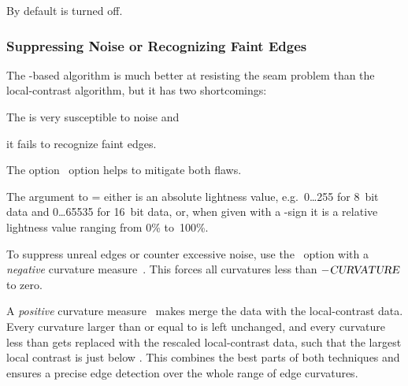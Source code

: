 By default  is turned off.


\subsubsection[Suppressing Noise or Recognizing Faint Edges]{%
  \label{sec:suppressing-noise-or-recognizing-faint-edges}%
  Suppressing Noise or Recognizing Faint Edges}

The -based algorithm is much better at resisting the seam problem than the
local-contrast algorithm, but it has two shortcomings:

\begin{compactenumerate}
\item
  The  is very susceptible to noise and

\item
  it fails to recognize faint edges.
\end{compactenumerate}

\noindent The option~ option helps to mitigate both flaws.

The argument to = either is an absolute
lightness value, e.g.\ 0\dots255 for 8~bit data and 0\dots65535 for 16~bit data, or, when given
with a \sample{\%}-sign it is a relative lightness value ranging from 0\% to~100\%.

To suppress unreal edges or counter excessive noise, use the ~option with a \emph{negative} curvature measure~.  This forces
all curvatures less than $-\textsl{CURVATURE}$ to zero.

A \emph{positive} curvature measure~ makes \App{} merge the 
data with the local-contrast data.  Every curvature larger than or equal to 
is left unchanged, and every curvature less than  gets replaced with the
rescaled local-contrast data, such that the largest local contrast is just below
.  This combines the best parts of both techniques and ensures a precise edge
detection over the whole range of edge curvatures.

\noindent{}

